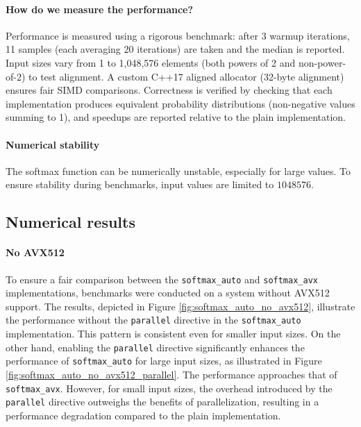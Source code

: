 \documentclass[10pt]{article}
\begin{document}
\paragraph{How do we measure the performance?}
Performance is measured using a rigorous benchmark: after 3 warmup iterations, 11 samples (each averaging 20 iterations) are taken and the median is reported. Input sizes vary from 1 to 1,048,576 elements (both powers of 2 and non-power-of-2) to test alignment. A custom C++17 aligned allocator (32-byte alignment) ensures fair SIMD comparisons. Correctness is verified by checking that each implementation produces equivalent probability distributions (non-negative values summing to 1), and speedups are reported relative to the plain implementation.

\paragraph{Numerical stability} The softmax function can be numerically unstable, especially for large values. To ensure stability during benchmarks, input values are limited to $1048576$.

\subsection{Numerical results}
\paragraph{No AVX512} To ensure a fair comparison between the \texttt{softmax\_auto} and \texttt{softmax\_avx} implementations, benchmarks were conducted on a system without AVX512 support. The results, depicted in Figure \ref{fig:softmax_auto_no_avx512}, illustrate the performance without the \texttt{parallel} directive in the \texttt{softmax\_auto} implementation. This pattern is consistent even for smaller input sizes. On the other hand, enabling the \texttt{parallel} directive significantly enhances the performance of \texttt{softmax\_auto} for large input sizes, as illustrated in Figure \ref{fig:softmax_auto_no_avx512_parallel}. The performance approaches that of \texttt{softmax\_avx}. However, for small input sizes, the overhead introduced by the \texttt{parallel} directive outweighs the benefits of parallelization, resulting in a performance degradation compared to the plain implementation.
\end{document}
